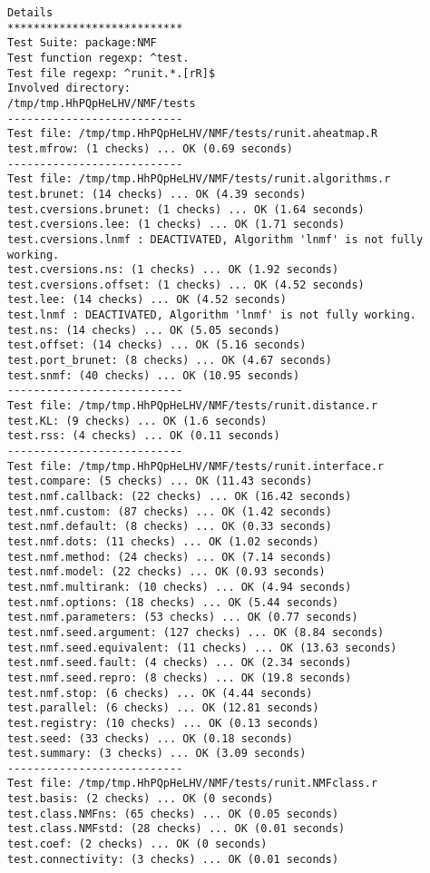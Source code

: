\documentclass[10pt]{article}
\begin{document}
\begin{verbatim}
Details 
*************************** 
Test Suite: package:NMF 
Test function regexp: ^test. 
Test file regexp: ^runit.*.[rR]$ 
Involved directory: 
/tmp/tmp.HhPQpHeLHV/NMF/tests 
--------------------------- 
Test file: /tmp/tmp.HhPQpHeLHV/NMF/tests/runit.aheatmap.R 
test.mfrow: (1 checks) ... OK (0.69 seconds)
--------------------------- 
Test file: /tmp/tmp.HhPQpHeLHV/NMF/tests/runit.algorithms.r 
test.brunet: (14 checks) ... OK (4.39 seconds)
test.cversions.brunet: (1 checks) ... OK (1.64 seconds)
test.cversions.lee: (1 checks) ... OK (1.71 seconds)
test.cversions.lnmf : DEACTIVATED, Algorithm 'lnmf' is not fully working.
test.cversions.ns: (1 checks) ... OK (1.92 seconds)
test.cversions.offset: (1 checks) ... OK (4.52 seconds)
test.lee: (14 checks) ... OK (4.52 seconds)
test.lnmf : DEACTIVATED, Algorithm 'lnmf' is not fully working.
test.ns: (14 checks) ... OK (5.05 seconds)
test.offset: (14 checks) ... OK (5.16 seconds)
test.port_brunet: (8 checks) ... OK (4.67 seconds)
test.snmf: (40 checks) ... OK (10.95 seconds)
--------------------------- 
Test file: /tmp/tmp.HhPQpHeLHV/NMF/tests/runit.distance.r 
test.KL: (9 checks) ... OK (1.6 seconds)
test.rss: (4 checks) ... OK (0.11 seconds)
--------------------------- 
Test file: /tmp/tmp.HhPQpHeLHV/NMF/tests/runit.interface.r 
test.compare: (5 checks) ... OK (11.43 seconds)
test.nmf.callback: (22 checks) ... OK (16.42 seconds)
test.nmf.custom: (87 checks) ... OK (1.42 seconds)
test.nmf.default: (8 checks) ... OK (0.33 seconds)
test.nmf.dots: (11 checks) ... OK (1.02 seconds)
test.nmf.method: (24 checks) ... OK (7.14 seconds)
test.nmf.model: (22 checks) ... OK (0.93 seconds)
test.nmf.multirank: (10 checks) ... OK (4.94 seconds)
test.nmf.options: (18 checks) ... OK (5.44 seconds)
test.nmf.parameters: (53 checks) ... OK (0.77 seconds)
test.nmf.seed.argument: (127 checks) ... OK (8.84 seconds)
test.nmf.seed.equivalent: (11 checks) ... OK (13.63 seconds)
test.nmf.seed.fault: (4 checks) ... OK (2.34 seconds)
test.nmf.seed.repro: (8 checks) ... OK (19.8 seconds)
test.nmf.stop: (6 checks) ... OK (4.44 seconds)
test.parallel: (6 checks) ... OK (12.81 seconds)
test.registry: (10 checks) ... OK (0.13 seconds)
test.seed: (33 checks) ... OK (0.18 seconds)
test.summary: (3 checks) ... OK (3.09 seconds)
--------------------------- 
Test file: /tmp/tmp.HhPQpHeLHV/NMF/tests/runit.NMFclass.r 
test.basis: (2 checks) ... OK (0 seconds)
test.class.NMFns: (65 checks) ... OK (0.05 seconds)
test.class.NMFstd: (28 checks) ... OK (0.01 seconds)
test.coef: (2 checks) ... OK (0 seconds)
test.connectivity: (3 checks) ... OK (0.01 seconds)

\end{verbatim}
\end{document}
